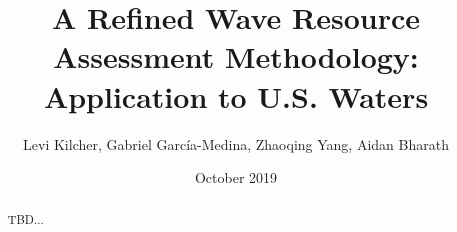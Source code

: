 \documentclass[authoryear,preprint]{elsarticle}
\title{A Refined Wave Resource Assessment Methodology: Application to U.S. Waters}
\author{Levi Kilcher, Gabriel Garc\'ia-Medina, Zhaoqing Yang, Aidan Bharath}
\date{October 2019}
\begin{document}
\begin{abstract}
TBD...
\end{abstract}

\maketitle


%




\appendix




\clearpage



\end{document}

